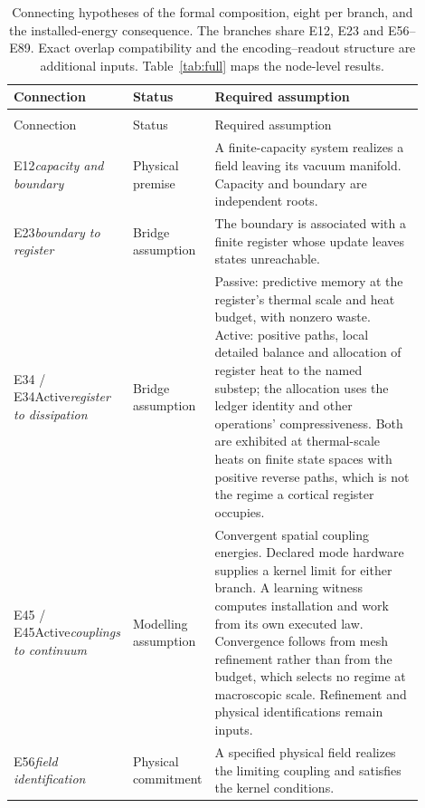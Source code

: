 \documentclass{article}
\begin{document}
\begingroup
\singlespacing
\small
\setlength{\LTcapwidth}{\linewidth}
\begin{longtable}{>{\raggedright\arraybackslash}p{0.17\linewidth}>{\raggedright\arraybackslash}p{0.19\linewidth}>{\raggedright\arraybackslash}p{0.54\linewidth}}
\caption{Connecting hypotheses of the formal composition, eight per branch, and the installed-energy consequence. The branches share E12, E23 and E56--E89. Exact overlap compatibility and the encoding--readout structure are additional inputs. Table~\ref{tab:full} maps the node-level results.}
\label{tab:edges}\\
\hline
Connection & Status & Required assumption \\
\hline
\endfirsthead
\multicolumn{3}{l}{\small\itshape Table \thetable\ (continued)}\\
\hline
Connection & Status & Required assumption \\
\hline
\endhead
\hline
\endfoot
E12\newline\textit{capacity and boundary} & Physical premise & A finite-capacity system realizes a field leaving its vacuum manifold. Capacity and boundary are independent roots. \\
E23\newline\textit{boundary to register} & Bridge assumption & The boundary is associated with a finite register whose update leaves states unreachable. \\
E34 / E34Active\newline\textit{register to dissipation} & Bridge assumption & Passive: predictive memory at the register's thermal scale and heat budget, with nonzero waste. Active: positive paths, local detailed balance and allocation of register heat to the named substep; the allocation uses the ledger identity and other operations' compressiveness. Both are exhibited at thermal-scale heats on finite state spaces with positive reverse paths, which is not the regime a cortical register occupies. \\
E45 / E45Active\newline\textit{couplings to continuum} & Modelling assumption & Convergent spatial coupling energies. Declared mode hardware supplies a kernel limit for either branch. A learning witness computes installation and work from its own executed law. Convergence follows from mesh refinement rather than from the budget, which selects no regime at macroscopic scale. Refinement and physical identifications remain inputs. \\
E56\newline\textit{field identification} & Physical commitment & A specified physical field realizes the limiting coupling and satisfies the kernel conditions. \\

\end{longtable}
\end{document}
